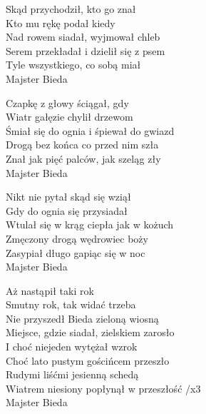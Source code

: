 
\begin{text}
    Skąd przychodził, kto go znał\\
    Kto mu rękę podał kiedy\\
    Nad rowem siadał, wyjmował chleb\\
    Serem przekładał i dzielił się z psem\\
    Tyle wszystkiego, co sobą miał\\
    Majster Bieda

    Czapkę z głowy ściągał, gdy\\
    Wiatr gałęzie chylił drzewom\\
    Śmiał się do ognia i śpiewał do gwiazd\\
    Drogą bez końca co przed nim szła\\
    Znał jak pięć palców, jak szeląg zły\\
    Majster Bieda

    Nikt nie pytał skąd się wziął\\
    Gdy do ognia się przysiadał\\
    Wtulał się w krąg ciepła jak w kożuch\\
    Zmęczony drogą wędrowiec boży\\
    Zasypiał długo gapiąc się w noc\\
    Majster Bieda

    Aż nastąpił taki rok\\
    Smutny rok, tak widać trzeba\\
    Nie przyszedł Bieda zieloną wiosną\\
    Miejsce, gdzie siadał, zielskiem zarosło\\
    I choć niejeden wytężał wzrok\\
    Choć lato pustym gościńcem przeszło\\
    Rudymi liśćmi jesienną schedą\\
    Wiatrem niesiony popłynął w przeszłość /x3\\
    Majster Bieda
\end{text}
\begin{chord}

\end{chord}